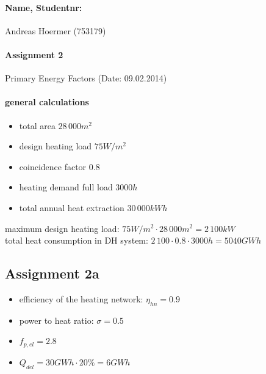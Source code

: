 \documentclass{article}
\begin{document}
	\paragraph{Name, Studentnr: }Andreas Hoermer (753179)
	\paragraph{Assignment 2}Primary Energy Factors (Date: 09.02.2014)
	\paragraph{general calculations}
		\begin{itemize}
			\item total area $28\,000m^2$
			\item design heating load $75W/m^2$
			\item coincidence factor $0.8$
			\item heating demand full load $3000h$
			\item total annual heat extraction $30\,000kWh$
		\end{itemize}
		maximum design heating load: $75W/m^2\cdot 28\,000m^2 = 2\,100kW$\\
		total heat consumption in DH system: $2\,100\cdot 0.8\cdot 3000h = 5040GWh$\\

	\subsection*{Assignment 2a}
		\begin{itemize}
			\item efficiency of the heating network: $\eta_{hn}=0.9$
			\item power to heat ratio: $\sigma=0.5$
			\item $f_{p,el}=2.8$
			\item $Q_{del}=30GWh\cdot 20\%=6GWh$
		\end{itemize}
\end{document}
